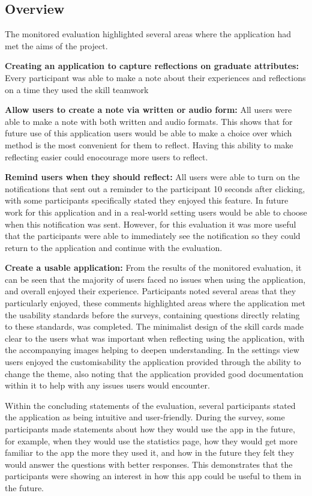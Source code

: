 \documentclass{l4proj}
\begin{document}
\subsection{Overview}

The monitored evaluation highlighted several areas where the application had met the aims of the project.

\textbf{Creating an application to capture reflections on graduate attributes:} Every participant was able to make a note about their experiences and reflections on a time they used the skill teamwork

\textbf{Allow users to create a note via written or audio form:} All users were able to make a note with both written and audio formats. This shows that for future use of this application users would be able to make a choice over which method is the most convenient for them to reflect. Having this ability to make reflecting easier could enocourage more users to reflect.
 
\textbf{Remind users when they should reflect:} All users were able to turn on the notifications that sent out a reminder to the participant 10 seconds after clicking, with some participants specifically stated they enjoyed this feature. In future work for this application and in a real-world setting users would be able to choose when this notification was sent. However, for this evaluation it was more useful that the participants were able to immediately see the notification so they could return to the application and continue with the evaluation.

\textbf{Create a usable application:} From the results of the monitored evaluation, it can be seen that the majority of users faced no issues when using the application, and overall enjoyed their experience. Participants noted several areas that they particularly enjoyed, these comments highlighted areas where the application met the usability standards before the surveys, containing questions directly relating to these standards, was completed. The minimalist design of the skill cards made clear to the users what was important when reflecting using the application, with the accompanying images helping to deepen understanding. In the settings view users enjoyed the customisability the application provided through the ability to change the theme, also noting that the application provided good documentation within it to help with any issues users would encounter.

Within the concluding statements of the evaluation, several participants stated the application as being intuitive and user-friendly. During the survey, some participants made statements about how they would use the app in the future, for example, when they would use the statistics page, how they would get more familiar to the app the more they used it, and how in the future they felt they would answer the questions with better responses. This demonstrates that the participants were showing an interest in how this app could be useful to them in the future.
\end{document}
